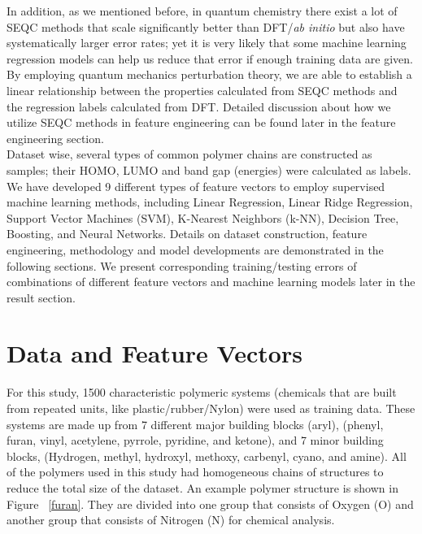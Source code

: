 \documentclass[10pt, oneside]{article}   	%
\begin{document}
In addition, as we mentioned before, in quantum chemistry there exist a lot of SEQC methods that scale significantly better than DFT/\textit{ab initio} but also have systematically larger error rates; yet it is very likely that some machine learning regression models can help us reduce that error if enough training data are given. By employing quantum mechanics perturbation theory, we are able to establish a linear relationship between the properties calculated from SEQC methods and the regression labels calculated from DFT. Detailed discussion about how we utilize SEQC methods in feature engineering can be found later in the feature engineering section. \\

Dataset wise, several types of common polymer chains are constructed as samples; their HOMO, LUMO and band gap (energies) were calculated as labels. We have developed 9 different types of feature vectors to employ supervised machine learning methods, including Linear Regression, Linear Ridge Regression, Support Vector Machines (SVM), K-Nearest Neighbors (k-NN), Decision Tree, Boosting, and Neural Networks. Details on dataset construction, feature engineering, methodology and model developments are demonstrated in the following sections. We present corresponding training/testing errors of combinations of different feature vectors and machine learning models later in the result section. \\




\section{Data and Feature Vectors}

\noindent For this study, 1500 characteristic polymeric systems (chemicals that are built from repeated units, like plastic/rubber/Nylon) were used as training data. These systems are made up from 7 different major building blocks (aryl), (phenyl, furan, vinyl, acetylene, pyrrole, pyridine, and ketone), and 7 minor building blocks, (Hydrogen, methyl, hydroxyl, methoxy, carbenyl, cyano, and amine). All of the polymers used in this study had homogeneous chains of structures to reduce the total size of the dataset. An example polymer structure is shown in Figure ~\ref{furan}. They are divided into one group that consists of Oxygen (O) and another group that consists of Nitrogen (N) for chemical analysis.
\end{document}
